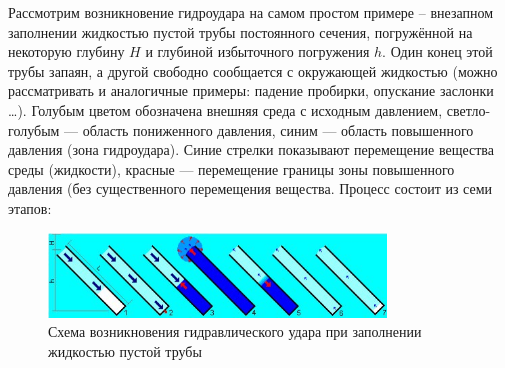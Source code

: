 \documentclass[a4paper, 14pt]{article}
\begin{document}
    Рассмотрим возникновение гидроудара на самом простом примере -- внезапном заполнении жидкостью пустой трубы
    постоянного сечения, погружённой на некоторую глубину $H$ и глубиной избыточного погружения $h$.
    Один конец этой трубы запаян, а другой свободно сообщается с окружающей жидкостью (можно рассматривать и
    аналогичные примеры: падение пробирки, опускание заслонки \ldots). Голубым цветом обозначена внешняя среда с
    исходным давлением, светло-голубым — область пониженного давления, синим — область повышенного давления (зона
    гидроудара).
    Синие стрелки показывают перемещение вещества среды (жидкости), красные — перемещение границы зоны повышенного
    давления (без существенного перемещения вещества.
    Процесс состоит из семи этапов:

    \begin{figure}
        \begin{center}
            \includegraphics[width=0.8\textwidth]{phases}
        \end{center}
        \caption{Схема возникновения гидравлического удара при заполнении жидкостью пустой трубы~\cite{3}}
    \end{figure}
\end{document}
